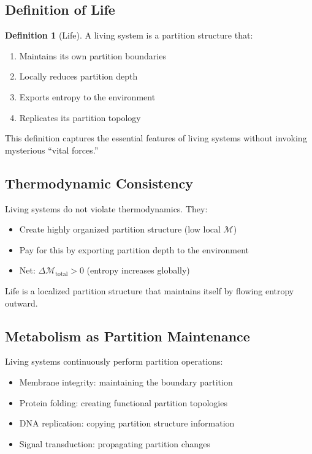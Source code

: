 \documentclass[twocolumn,10pt,a4paper]{article}
\theoremstyle{definition}
\newtheorem{definition}[theorem]{Definition}
\theoremstyle{remark}
\newcommand{\Depth}{\mathcal{M}}
\begin{document}
\subsection{Definition of Life}

\begin{definition}[Life]
\label{def:life}
A living system is a partition structure that:
\begin{enumerate}
    \item Maintains its own partition boundaries
    \item Locally reduces partition depth
    \item Exports entropy to the environment
    \item Replicates its partition topology
\end{enumerate}
\end{definition}

This definition captures the essential features of living systems without invoking mysterious ``vital forces.''

\subsection{Thermodynamic Consistency}

Living systems do not violate thermodynamics. They:
\begin{itemize}
    \item Create highly organized partition structure (low local $\Depth$)
    \item Pay for this by exporting partition depth to the environment
    \item Net: $\Delta\Depth_{\mathrm{total}} > 0$ (entropy increases globally)
\end{itemize}

Life is a localized partition structure that maintains itself by flowing entropy outward.

\subsection{Metabolism as Partition Maintenance}

Living systems continuously perform partition operations:
\begin{itemize}
    \item Membrane integrity: maintaining the boundary partition
    \item Protein folding: creating functional partition topologies
    \item DNA replication: copying partition structure information
    \item Signal transduction: propagating partition changes
\end{itemize}
\end{document}

